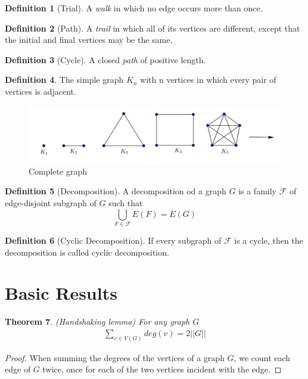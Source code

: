 \documentclass[	DIV=calc,paper=a4,fontsize=11pt]{scrartcl}	 					%
\newtheorem{thm}{Theorem}[section]
\theoremstyle{definition}
\newtheorem{defn}[thm]{Definition}
\theoremstyle{plain}
\theoremstyle{remark}
\begin{document}
\begin{defn}[Trial]
A \textit{walk} in which no edge occurs more than once.
\end{defn}

\begin{defn}[Path]
A \textit{trail} in which all of its vertices are different, except that the initial and final vertices may be the same.
\end{defn}

\begin{defn}[Cycle]
A closed \textit{path} of positive length.
\end{defn}

\begin{defn}
The simple graph $K_n$ with n vertices in which every pair of vertices is adjacent.
\end{defn}

\begin{figure}[hbt!]
\centering
\includegraphics[width=.5\textwidth]{completegraph.png}
\caption{Complete graph}\label{fig3}
\end{figure}

\begin{defn}[Decomposition] A decomposition od a graph $G$ is a family $\mathcal{F}$ of edge-disjoint subgraph of $G$ such that $$ \bigcup_{F\in \mathcal{F}}E(F) = E(G)$$

\end{defn}

\begin{defn}[Cyclic Decomposition]
If every subgraph of $\mathcal{F}$ is a cycle, then the decomposition is called cyclic decomposition.
\end{defn}

\section{Basic Results}

\begin{thm}(Handshaking lemma)
For any graph $G$
\begin{align}
\sum_{v\in V(G)}deg(v)=2||G||
\end{align}
\end{thm}

\begin{proof}
When summing the degrees of the vertices of a graph $G$, we count each edge of $G$ twice, once for each of the two vertices incident with the edge.
\end{proof}
\end{document}
